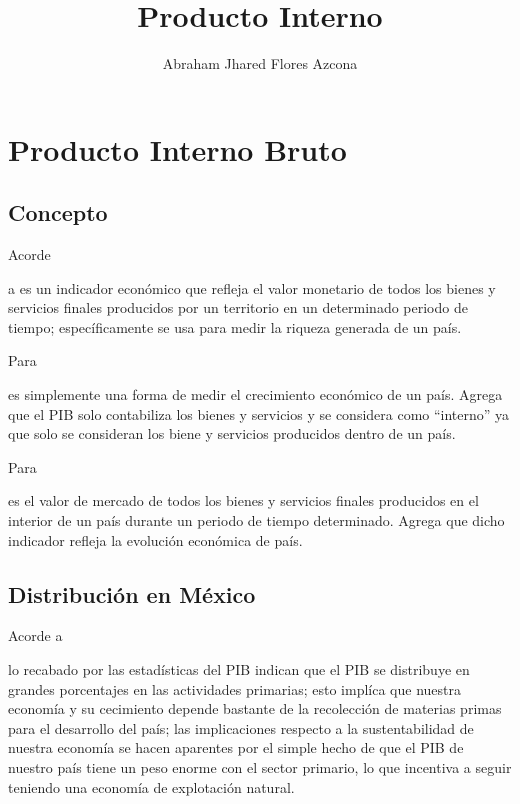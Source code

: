 \documentclass[stu, 12pt, letterpaper, donotrepeattitle, floatsintext, natbib]{apa7}
\title{\Large Producto Interno }
\author{Abraham Jhared Flores Azcona} %
\affiliation{Instituto Tecnológico de Tijuana}
\begin{document}
\maketitle


\renewcommand\contentsname{Contenido}
\tableofcontents
\renewcommand{\listfigurename}{Ecuaciones}
\listoffigures

\newpage
\section{Producto Interno Bruto}
\subsection{Concepto}
Acorde \begin{justifying}
    a \cite{arias-2021A}%
    es un indicador económico que refleja el valor monetario de todos los bienes y servicios finales producidos por
    un territorio en un determinado periodo de tiempo; específicamente se usa para medir la riqueza generada de un país.\par
\end{justifying}
Para \begin{justifying}
  \cite{banco-de-mexico-no-date}%
  es simplemente una forma de medir el crecimiento económico de un país. Agrega que el PIB solo contabiliza los bienes y servicios y se 
  considera como ``interno'' ya que solo se consideran los biene y servicios producidos dentro de un país.\par
\end{justifying}
Para \begin{justifying}
  \cite{lorente-2020}%
  es el valor de mercado de todos los bienes y servicios finales producidos en el interior de un país durante un periodo de tiempo determinado. Agrega
  que dicho indicador refleja la evolución económica de país.\par
\end{justifying}
\vspace{\baselineskip}
\subsection{Distribución en México}
Acorde a \begin{justifying}
  lo recabado por \cite{rombiola-2020} %
  las estadísticas del PIB indican que el PIB se distribuye en grandes porcentajes en las actividades primarias; esto implíca que nuestra economía
   y su cecimiento depende bastante de la recolección de materias primas para el desarrollo del país; las implicaciones respecto a la sustentabilidad
   de nuestra economía se hacen aparentes por el simple hecho de que el PIB de nuestro país tiene un peso enorme con el sector primario, lo que incentiva a seguir
  teniendo una economía de explotación natural.\par
\end{justifying}
\end{document}
